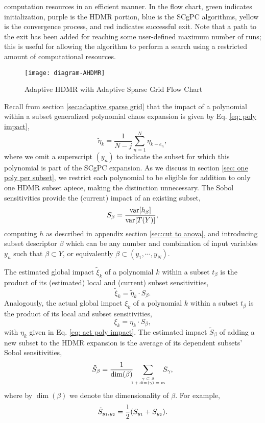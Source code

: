 computation resources in an efficient manner.  In the flow chart, green indicates initialization, purple
is the HDMR portion, blue is the SCgPC algorithms, yellow is the
convergence process, and red indicates successful exit.  Note that a path to the exit has been added for 
reaching some
user-defined maximum number of runs; this is useful for allowing the algorithm to perform a search using a
restricted amount of computational resources.
\begin{figure}[H]
  \centering
  \texttt{[image: diagram-AHDMR]}
  \caption{Adaptive HDMR with Adaptive Sparse Grid Flow Chart}
  \label{fig:ahdmr}
\end{figure}


Recall from section \ref{sec:adaptive sparse grid} that the impact of a polynomial within a subset generalized
polynomial chaos expansion is given by Eq. \ref{eq: poly impact},
\begin{equation}
  \tilde \eta_k = \frac{1}{N-j}\sum_{n=1}^N \eta_{k-e_n},
\end{equation}
where we omit a superscript $(y_n)$ to indicate the subset for which this polynomial is part of the SCgPC expansion.
As we discuss in section \ref{sec: one poly per subset}, we restrict each 
polynomial to be eligible for addition to only one HDMR subset apiece, making the distinction unnecessary.  
The Sobol sensitivities provide the (current) impact of an existing subset,
\begin{equation}
  S_\beta = \frac{\text{var}\qty[h_\beta]}{\text{var}\qty[T(Y)]},
\end{equation}
computing $h$ as described in appendix section \ref{sec:cut to anova}, and introducing subset descriptor $\beta$ which
can be any number and combination of input variables $y_n$ such that $\beta\subset Y$, or equivalently
$\beta\subset (y_1,\cdots,y_N)$.  

The estimated global impact $\tilde\xi_k$ of a
polynomial $k$ within a
subset $t_\beta$ is the product of its (estimated) local and (current) subset sensitivities,
\begin{equation}
  \tilde \xi_k = \tilde\eta_k\cdot S_\beta.
\end{equation}
Analogously, the actual global impact $\xi_k$ of a polynomial $k$ within a subset $t_\beta$ is the
product of its local and subset sensitivities,
\begin{equation}
  \xi_k = \eta_k\cdot S_\beta,
\end{equation}
with $\eta_k$ given in Eq. \ref{eq: act poly impact}.
The estimated impact $\tilde S_\beta$ of adding a new subset to the HDMR expansion is the average of its
dependent subsets' Sobol sensitivities,
\begin{equation}
  \tilde S_\beta = \frac{1}{\dim(\beta)}\hspace{-10pt} \mlsum{\gamma\subset\beta\\1+\dim(\gamma)=m}{}\hspace{-10pt} S_\gamma,
\end{equation}
where by $\dim(\beta)$ we denote the dimensionality of $\beta$.  For example,
\begin{equation}
  \tilde S_{y_1,y_2} = \frac{1}{2}\qty(S_{y_1}+S_{y_2}).
\end{equation}

